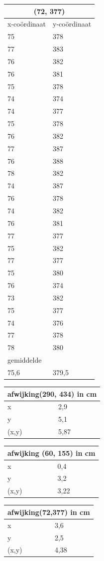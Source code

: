 \documentclass{article}
\begin{document}
\begin{tabular}{ |l|l| }
  \hline
  \multicolumn{2}{|c|}{(72, 377)} \\
  \hline
  x-co\"ordinaat & y-co\"ordinaat \\ \hline
     75 & 378\\ \hline
     77 & 383\\ \hline
     76 & 382\\ \hline
     76 & 381\\ \hline
     75 & 378\\ \hline
     74 & 374\\ \hline
     74 & 377\\ \hline
     75 & 378\\ \hline
     76 & 382\\ \hline
     77 & 387\\ \hline
     76 & 388\\ \hline
     78 & 382\\ \hline
     74 & 387\\ \hline
     76 & 378\\ \hline
     74 & 382\\ \hline
     76 & 381\\ \hline
     77 & 377\\ \hline
     75 & 382\\ \hline
     77 & 377\\ \hline
     75 & 380\\ \hline
     76 & 374\\ \hline
     73 & 382\\ \hline
     75 & 377\\ \hline
     74 & 376\\ \hline
     77 & 378\\ \hline
     78 & 380\\ \hline\hline
     \multicolumn{2}{|l|}{gemiddelde} \\ \hline
     75,6 & 379,5 \\ \hline 
\end{tabular}
\newline
\begin{tabular}{ |l|p{}| }
  \hline
  \multicolumn{2}{|c|}{afwijking(290, 434) in cm} \\
  \hline
  x & 2,9 \\ \hline
  y & 5,1 \\ \hline
  (x,y) & 5,87 \\ \hline
\end{tabular}
\begin{tabular}{ |l|p{}| }
  \hline
  \multicolumn{2}{|c|}{afwijking (60, 155) in cm} \\
  \hline
  x & 0,4 \\ \hline
  y & 3,2 \\ \hline
  (x,y) & 3,22 \\ \hline
\end{tabular}
\begin{tabular}{ |l|p{}| }
  \hline
  \multicolumn{2}{|c|}{afwijking(72,377) in cm} \\
  \hline
  x & 3,6 \\ \hline
  y & 2,5 \\ \hline
  (x,y) & 4,38 \\ \hline
\end{tabular}
\end{document}
